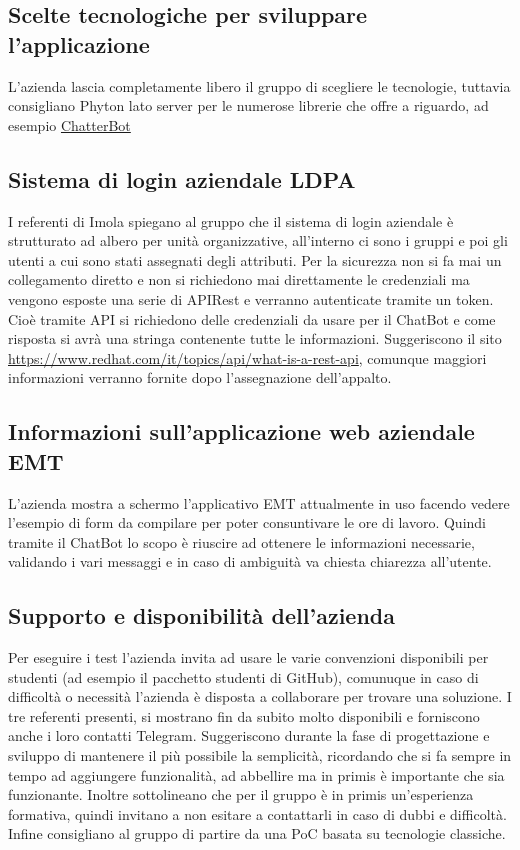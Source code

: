 \documentclass[12pt, a4paper,table]{article}
\begin{document}
        \subsection{Scelte tecnologiche per sviluppare l'applicazione}
        L'azienda lascia completamente libero il gruppo di scegliere le tecnologie, tuttavia 
        consigliano Phyton lato server per le numerose librerie che offre a riguardo, 
		ad esempio \href{https://chatterbot.readthedocs.io/en/stable/}{ChatterBot}

		\subsection{Sistema di login aziendale LDPA}
		I referenti di Imola spiegano al gruppo che il sistema di login aziendale è strutturato ad albero 
		per unità organizzative, all'interno ci sono i gruppi e poi gli utenti a cui sono stati assegnati degli attributi. 
		Per la sicurezza non si fa mai un collegamento diretto e non si richiedono mai direttamente le credenziali
		ma vengono esposte una serie di APIRest e verranno autenticate tramite un token. 
		Cioè tramite API si richiedono delle credenziali da usare per il ChatBot e come risposta si avrà 
		una stringa contenente tutte le informazioni. Suggeriscono il sito 
		\href{https://www.redhat.com/it/topics/api/what-is-a-rest-api}{https://www.redhat.com/it/topics/api/what-is-a-rest-api},
		comunque maggiori informazioni verranno fornite dopo l'assegnazione dell'appalto.
		
		\subsection{Informazioni sull'applicazione web aziendale EMT}
		L'azienda mostra a schermo l'applicativo EMT attualmente in uso facendo vedere l'esempio di form 
		da compilare per poter consuntivare le ore di lavoro. Quindi tramite il ChatBot lo scopo è riuscire 
		ad ottenere le informazioni necessarie, validando i vari messaggi e in caso di ambiguità va chiesta
		chiarezza all'utente.

		\subsection{Supporto e disponibilità dell'azienda}
		Per eseguire i test l'azienda invita ad usare le varie convenzioni disponibili per studenti 
		(ad esempio il pacchetto studenti di GitHub), comunuque in caso di difficoltà o necessità 
		l'azienda è disposta a collaborare per trovare una soluzione.
		I tre referenti presenti, si mostrano fin da subito molto disponibili e forniscono
		anche i loro contatti Telegram. \newline
		Suggeriscono durante la fase di progettazione e sviluppo di mantenere il più possibile 
		la semplicità, ricordando che si fa sempre in tempo ad aggiungere funzionalità, ad abbellire 
		ma in primis è importante che sia funzionante. Inoltre sottolineano che per  il gruppo è in primis 
		un'esperienza formativa, quindi invitano a non esitare a contattarli in caso di dubbi e difficoltà. 
		Infine consigliano al gruppo di partire da una PoC basata su tecnologie classiche.
\end{document}
